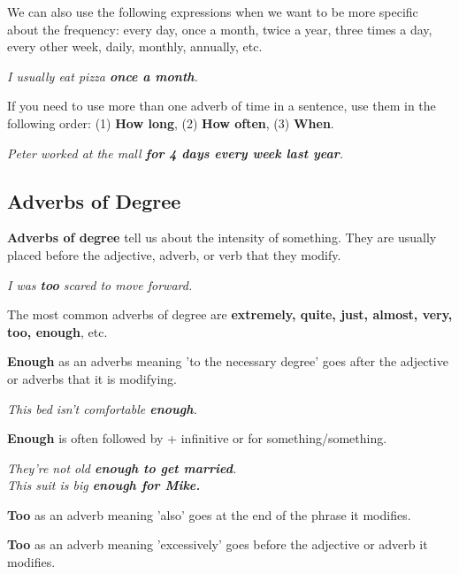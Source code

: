 \documentclass[hidelinks,10pt,a4paper]{article}
\begin{document}
We can also use the following expressions when we want to be more specific about the frequency: every day, once a month, twice a year, three times a day, every other week, daily, monthly, annually, etc.

\begin{center}
	\textit{I usually eat pizza \textbf{once a month}. }
\end{center}

If you need to use more than one adverb of time in a sentence, use them in the following order: (1) \textbf{How long}, (2) \textbf{How often}, (3) \textbf{When}.

\begin{center}
	\textit{Peter worked at the mall \textbf{for 4 days every week last year}. }
\end{center}

\subsection{Adverbs of Degree}
\textbf{Adverbs of degree} tell us about the intensity of something. They are usually placed before the adjective, adverb, or verb that they modify.

\begin{center}
	\textit{I was \textbf{too} scared to move forward.}
\end{center}

The most common adverbs of degree are \textbf{extremely, quite, just, almost, very, too, enough}, etc.

\textbf{Enough} as an adverbs meaning 'to the necessary degree' goes after the adjective or adverbs that it is modifying.

\begin{center}
	\textit{This bed isn't comfortable \textbf{enough}.}
\end{center}

\textbf{Enough} is often followed by + infinitive or for something/something.

\begin{center}
	\textit{They're not old \textbf{enough to get married}. \\
	This suit is big \textbf{enough for Mike.} }
\end{center}

\textbf{Too} as an adverb meaning 'also' goes at the end of the phrase it modifies.

\textbf{Too} as an adverb meaning 'excessively' goes before the adjective or adverb it modifies.
\end{document}
